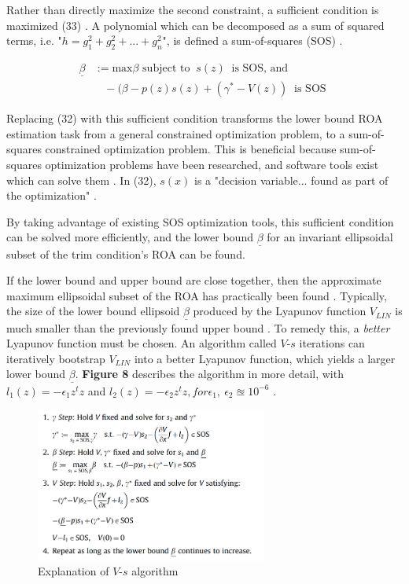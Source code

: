 \documentclass[%
 reprint,
 amsmath,amssymb,
 aps,
]{revtex4-2}
\begin{document}
Rather than directly maximize the second constraint, a sufficient condition is maximized (33) \cite{primary}. A polynomial which can be decomposed as a sum of squared terms, i.e. "$h = g_1^2 + g_2^2 + ... + g_n^2$", is defined a sum-of-squares (SOS) \cite{primary}.

\begin{align*}
     \underline{\beta} &:= \text{max}\beta \text{ subject to } \ s(z) \ \text{ is SOS, and } \\ 
     &\ \ \ \ -(\beta - p(z)s(z) + (\gamma^* - V(z)) \ \text{ is SOS } \tag{33}
\end{align*}

Replacing (32) with this sufficient condition transforms the lower bound ROA estimation task from a general constrained optimization problem, to a sum-of-squares constrained optimization problem. This is beneficial because sum-of-squares optimization problems have been researched, and software tools exist which can solve them \cite{primary}\cite{sosopt}\cite{sostools}. In (32), $s(x)$ is a "decision variable... found as part of the optimization" \cite{primary}. 

By taking advantage of existing SOS optimization tools, this sufficient condition can be solved more efficiently, and the lower bound $\underline{\beta}$ for an invariant ellipsoidal subset of the trim condition's ROA can be found.

If the lower bound and upper bound are close together, then the approximate maximum ellipsoidal subset of the ROA has practically been found \cite{primary}. Typically, the size of the lower bound ellipsoid $\underline{\beta}$ produced by the Lyapunov function $V_{LIN}$ is much smaller than the previously found upper bound \cite{primary}. To remedy this, a \textit{better} Lyapunov function must be chosen. An algorithm called $V$-$s$ iterations can iteratively bootstrap $V_{LIN}$ into a better Lyapunov function, which yields a larger lower bound $\underline{\beta}$. \textbf{Figure 8} describes the algorithm in more detail, with $l_1 (z) = -\epsilon_1 z^t z$ and $l_2(z) = -\epsilon_2 z^t z, for \epsilon_1,\ \epsilon_2 \approxeq 10^{-6}$ \cite{primary}.

\begin{figure}
    \centering
    \includegraphics[width=3in]{vs_steps.png}
    \caption{Explanation of $V$-$s$ algorithm \cite{primary}}
    \label{fig:vs}
\end{figure}
\end{document}
